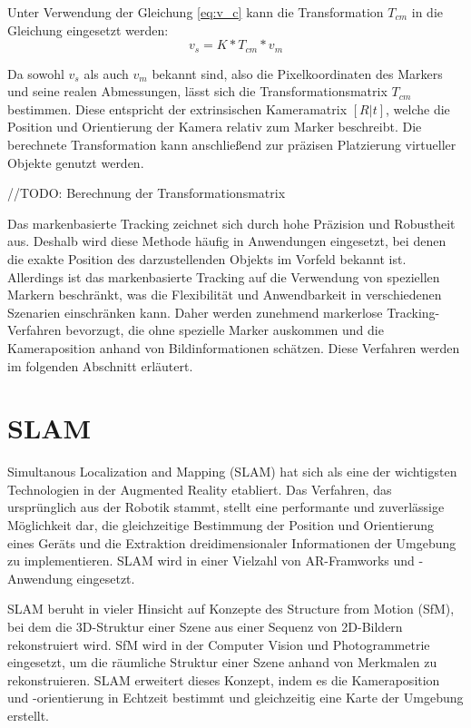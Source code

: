 Unter Verwendung der Gleichung \ref{eq:v_c} kann die Transformation \( T_{cm} \) in die Gleichung eingesetzt werden:
\begin{equation}
    v_s = K * T_{cm} * v_m
\end{equation}

Da sowohl \( v_s \) als auch \( v_m \) bekannt sind, also die Pixelkoordinaten des Markers und seine realen Abmessungen, lässt sich die Transformationsmatrix \( T_{cm} \) bestimmen. Diese entspricht der extrinsischen Kameramatrix \( [R|t] \), welche die Position und Orientierung der Kamera relativ zum Marker beschreibt. Die berechnete Transformation kann anschließend zur präzisen Platzierung virtueller Objekte genutzt werden.

//TODO: Berechnung der Transformationsmatrix

Das markenbasierte Tracking zeichnet sich durch hohe Präzision und Robustheit aus. Deshalb wird diese Methode häufig in Anwendungen eingesetzt, bei denen die exakte Position des darzustellenden Objekts im Vorfeld bekannt ist. Allerdings ist das markenbasierte Tracking auf die Verwendung von speziellen Markern beschränkt, was die Flexibilität und Anwendbarkeit in verschiedenen Szenarien einschränken kann. Daher werden zunehmend markerlose Tracking-Verfahren bevorzugt, die ohne spezielle Marker auskommen und die Kameraposition anhand von Bildinformationen schätzen. Diese Verfahren werden im folgenden Abschnitt erläutert. \cite{doerner2022virtual}

\section{SLAM}\label{SLAM}

Simultanous Localization and Mapping (SLAM) hat sich als eine der wichtigsten Technologien in der Augmented Reality etabliert. Das Verfahren, das ursprünglich aus der Robotik stammt, stellt eine performante und zuverlässige Möglichkeit dar, die gleichzeitige Bestimmung der Position und Orientierung eines Geräts und die Extraktion dreidimensionaler Informationen der Umgebung zu implementieren. SLAM wird in einer Vielzahl von AR-Framworks und -Anwendung eingesetzt. \cite{doerner2022virtual}

SLAM beruht in vieler Hinsicht auf Konzepte des Structure from Motion (SfM), bei dem die 3D-Struktur einer Szene aus einer Sequenz von 2D-Bildern rekonstruiert wird. SfM wird in der Computer Vision und Photogrammetrie eingesetzt, um die räumliche Struktur einer Szene anhand von Merkmalen zu rekonstruieren. SLAM erweitert dieses Konzept, indem es die Kameraposition und -orientierung in Echtzeit bestimmt und gleichzeitig eine Karte der Umgebung erstellt.

